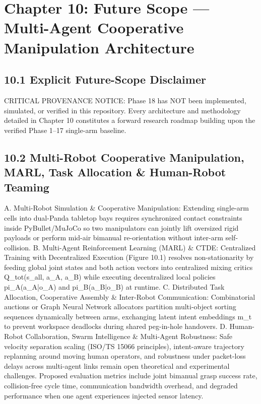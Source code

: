 \chapter{Chapter 10: Future Scope — Multi-Agent Cooperative Manipulation Architecture}
\section{10.1 Explicit Future-Scope Disclaimer}
CRITICAL PROVENANCE NOTICE: Phase 18 has NOT been implemented, simulated, or verified in this repository. Every architecture and methodology detailed in Chapter 10 constitutes a forward research roadmap building upon the verified Phase 1–17 single-arm baseline.

\section{10.2 Multi-Robot Cooperative Manipulation, MARL, Task Allocation \& Human-Robot Teaming}
A. Multi-Robot Simulation \& Cooperative Manipulation: Extending single-arm cells into dual-Panda tabletop bays requires synchronized contact constraints inside PyBullet/MuJoCo so two manipulators can jointly lift oversized rigid payloads or perform mid-air bimanual re-orientation without inter-arm self-collision.
B. Multi-Agent Reinforcement Learning (MARL) \& CTDE: Centralized Training with Decentralized Execution (Figure 10.1) resolves non-stationarity by feeding global joint states and both action vectors into centralized mixing critics Q\_tot(s\_all, a\_A, a\_B) while executing decentralized local policies pi\_A(a\_A|o\_A) and pi\_B(a\_B|o\_B) at runtime.
C. Distributed Task Allocation, Cooperative Assembly \& Inter-Robot Communication: Combinatorial auctions or Graph Neural Network allocators partition multi-object sorting sequences dynamically between arms, exchanging latent intent embeddings m\_t to prevent workspace deadlocks during shared peg-in-hole handovers.
D. Human-Robot Collaboration, Swarm Intelligence \& Multi-Agent Robustness: Safe velocity separation scaling (ISO/TS 15066 principles), intent-aware trajectory replanning around moving human operators, and robustness under packet-loss delays across multi-agent links remain open theoretical and experimental challenges. Proposed evaluation metrics include joint bimanual grasp success rate, collision-free cycle time, communication bandwidth overhead, and degraded performance when one agent experiences injected sensor latency.

